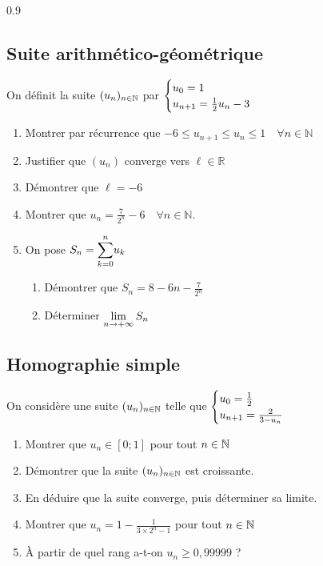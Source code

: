 \documentclass[oneside,12pt]{book}          %
\begin{document}
\begin{spacing}{0.9}
\subsection{Suite arithmético-géométrique}

On définit la suite ${(u_{n})_{n\in\mathbb N}}$ par $\defsuite{u_0=1}{\frac{1}{2}u_n-3}$
\begin{enumerate}
    \item Montrer par récurrence que $-6 \leq u_{n+1} \leq u_{n} \leq 1 \quad \forall n \in \mathbb{N}$
    \item Justifier que $(u_n)$ converge vers $\ell \in \mathbb{R}$
    \item Démontrer que $\ell = -6$
    \item Montrer que $u_n = \frac{7}{2^n} - 6 \quad \forall n \in \mathbb{N}$.
    \item On pose $S_n={\displaystyle\sum_{k=0}^{n}}u_k $ \begin{enumerate}
    	\item Démontrer que $S_n = 8-6n-\frac{7}{2^n}$
    	\item Déterminer ${\lim\limits_{n\to +\infty}}\, S_n$
    \end{enumerate}
\end{enumerate}

\end{spacing}


\subsection{Homographie simple}
On considère une suite ${(u_{n})_{n\in\mathbb N}}$ telle que $\defsuite{u_0=\frac{1}{2}}{\frac{2}{3-u_n}}$

\begin{enumerate}
    \item Montrer que $u_n\in[0;1]$ pour tout ${n\in\mathbb N}$
    \item Démontrer que la suite ${(u_{n})_{n\in\mathbb N}}$ est croissante.
    \item En déduire que la suite converge, puis déterminer sa limite.
    \item Montrer que $u_n=1-\frac{1}{3\times2^n-1}$ pour tout ${n\in\mathbb N}$
    \item À partir de quel rang a-t-on $u_n\geq 0,99999$ ?
\end{enumerate}
\end{document}
